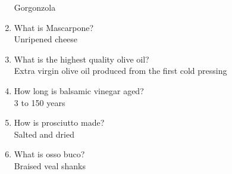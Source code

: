 \documentclass[11pt]{article}
\begin{document}
\begin{enumerate}
Gorgonzola
\item What is Mascarpone?\\
Unripened cheese
\item What is the highest quality olive oil?\\
Extra virgin olive oil produced from the first cold pressing
\item How long is balsamic vinegar aged?\\
3 to 150 years
\item How is prosciutto made?\\
Salted and dried
\item What is osso buco?\\
Braised veal shanks
\end{enumerate}
\end{document}
